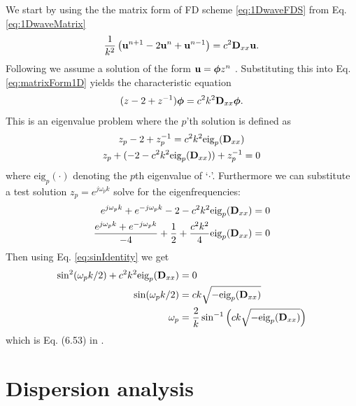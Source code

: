 We start by using the the matrix form of FD scheme \eqref{eq:1DwaveFDS} from Eq. \eqref{eq:1DwaveMatrix}
\begin{equation*}
    \frac{1}{k^2}\left(\mathbf{u}^{n+1}-2\mathbf{u}^n+\mathbf{u}^{n-1}\right) = c^2 \mathbf{D}_{xx}\mathbf{u}.
\end{equation*}
Following \cite{theBible} we assume a solution of the form $\mathbf{u} = \boldsymbol{\phi}z^n$ . Substituting this into Eq. \eqref{eq:matrixForm1D} yields the characteristic equation
\begin{equation}
    (z - 2 + z^{-1})\boldsymbol{\phi} = c^2k^2\mathbf{D}_{xx} \boldsymbol{\phi}.
\end{equation}
This is an eigenvalue problem where the $p$'th solution is defined as 
\begin{gather}
    z_p-2+z_p^{-1} = c^2k^2\text{eig}_p(\mathbf{D}_{xx})\nonumber\\
    z_p+(-2-c^2k^2\text{eig}_p(\mathbf{D}_{xx}))+z_p^{-1}=0
\end{gather}
where $\text{eig}_p(\cdot)$ denoting the $p$th eigenvalue of `$\cdot$'.  Furthermore we can substitute a test solution $z_p=e^{j\omega_pk}$ solve for the eigenfrequencies:
\begin{align*}
    e^{j\omega_pk}+e^{-j\omega_pk}-2-c^2k^2\text{eig}_p(\mathbf{D}_{xx})&=0\\
    \frac{e^{j\omega_pk}+e^{-j\omega_pk}}{-4}+\frac{1}{2}+\frac{c^2k^2}{4}\text{eig}_p(\mathbf{D}_{xx})&=0
\end{align*}
Then using Eq. \eqref{eq:sinIdentity} we get
\begin{align}
    \sin^2(\omega_pk/2)+c^2k^2\text{eig}_p(\mathbf{D}_{xx})&=0\nonumber\\
    \sin(\omega_pk/2)&=c k\sqrt{-\text{eig}_p(\mathbf{D}_{xx})}\nonumber\\
    \omega_p &= \frac{2}{k}\sin^{-1}\left(c k\sqrt{-\text{eig}_p(\mathbf{D}_{xx})}\right)
\end{align}
which is Eq. (6.53) in \cite{theBible}.

\section{Dispersion analysis}\label{sec:dispersionAnalysis}
